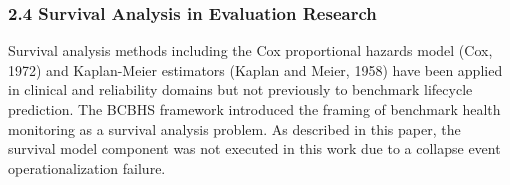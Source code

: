 \subsubsection{2.4 Survival Analysis in Evaluation Research}

Survival analysis methods including the Cox proportional hazards model (Cox, 1972) and Kaplan-Meier estimators (Kaplan and Meier, 1958) have been applied in clinical and reliability domains but not previously to benchmark lifecycle prediction. The BCBHS framework introduced the framing of benchmark health monitoring as a survival analysis problem. As described in this paper, the survival model component was not executed in this work due to a collapse event operationalization failure.

